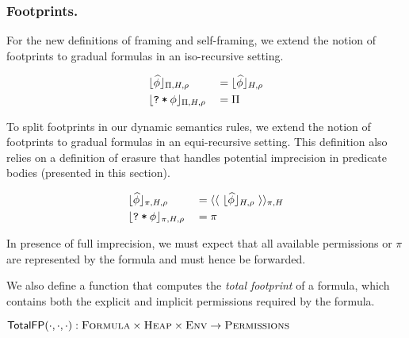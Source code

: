 \documentclass {llncs}
\begin{document}
\subsubsection{Footprints.}
For the new definitions of framing and self-framing, 
we extend the notion of footprints to gradual formulas in an iso-recursive setting.
\begin{small}
    \begin{alignat*}{2}
        &\lfloor\widehat{\phi}\rfloor_{\Pi, H,\rho} &&= \lfloor\widehat{\phi}\rfloor_{H,\rho}
        \\
        &\lfloor{\textup{\texttt{?}}}\:\textup{\texttt{*}}\:{\phi}\rfloor_{\Pi, H,\rho} &&= \Pi
    \end{alignat*}
\end{small}

To split footprints in our dynamic semantics rules, we extend the notion of footprints to gradual formulas in an equi-recursive setting. This definition also relies on a definition of erasure that handles potential imprecision in predicate bodies (presented in this section).

\begin{small}
    \begin{alignat*}{2}
        &\lfloor\widehat{\phi}\rfloor_{\pi, H,\rho} &&= \langle\langle ~\lfloor\widehat{\phi}\rfloor_{H,\rho}~ \rangle\rangle_{\pi,H}
        \\
        &\lfloor{\textup{\texttt{?}}}\:\textup{\texttt{*}}\:{\phi}\rfloor_{\pi, H,\rho} &&= \pi
    \end{alignat*}
\end{small}

In presence of full imprecision, %
we must expect that all available permissions \perm or $\pi$ are represented by the formula and must hence be forwarded.%

We also define a function that computes the \emph{total footprint} of a formula, which contains both the explicit and implicit permissions required by the formula.

\noindent $\textup{\textmd{\textsf{TotalFP}}}(\cdot,\cdot,\cdot): \textup{\textsc{Formula}} \times \textup{\textsc{Heap}} \times \textup{\textsc{Env}} \rightarrow \textup{\textsc{Permissions}}$
\end{document}
